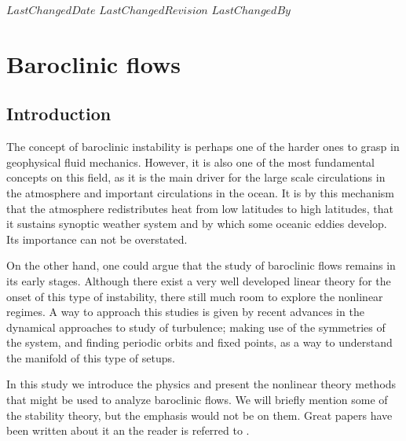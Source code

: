 {$LastChangedDate$}
{$LastChangedRevision$} {$LastChangedBy$}

\chapter{Baroclinic flows}
\label{chap:baroclinic}

\section{Introduction}
\label{s:intro}

The concept of baroclinic instability is perhaps one of the harder ones
to grasp in geophysical fluid mechanics. However, it is also one of the
most fundamental concepts on this field, as it is the main driver for the
large scale circulations in the atmosphere and important circulations in the
ocean. It is by this mechanism that the atmosphere redistributes heat from
low latitudes to high latitudes, that it sustains synoptic weather system and by which some oceanic eddies develop. Its importance can not be overstated.

On the other hand, one could argue that the study of baroclinic flows
remains in its early stages. Although there exist a very well developed
linear theory for the onset of this type of instability, there still much
room to explore the nonlinear regimes. A way to approach this studies is
given by recent advances in the dynamical approaches to study of
turbulence;
making use of the symmetries of the system, and finding periodic orbits
and fixed points, as a way to understand the manifold of this type of
setups.

In this study we introduce the physics and present the nonlinear theory
methods that might be used to analyze baroclinic flows. We will briefly
mention some of the stability theory, but the emphasis would not be on
them. Great papers have been written about it an the reader is referred
to .


